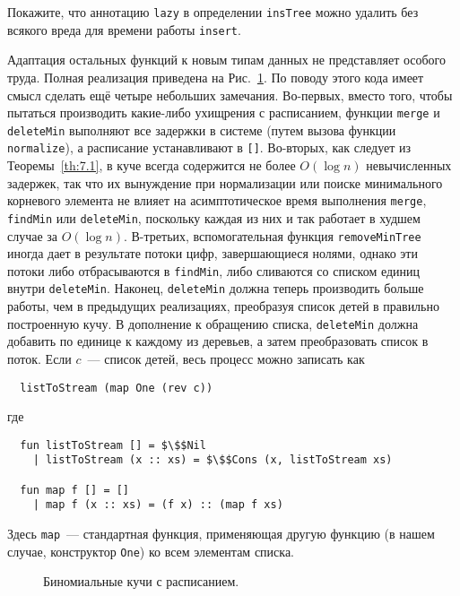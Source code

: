 \begin{exercise}\label{ex:7.3}
  Покажите, что аннотацию \lstinline!lazy! в определении
  \lstinline!insTree! можно удалить без всякого вреда для времени
  работы \lstinline!insert!.
\end{exercise}

Адаптация остальных функций к новым типам данных не представляет
особого труда. Полная реализация приведена на
Рис.~\ref{fig:7.2}. По поводу этого кода имеет смысл сделать ещё
четыре небольших замечания. Во-первых, вместо того, чтобы пытаться
производить какие-либо ухищрения с расписанием, функции
\lstinline!merge! и \lstinline!deleteMin! выполняют все задержки в
системе (путем вызова функции \lstinline!normalize!), а расписание
устанавливают в \lstinline![]!. Во-вторых, как следует из
Теоремы~\ref{th:7.1}, в куче всегда содержится не более $O(\log n)$
невычисленных задержек, так что их вынуждение при нормализации или
поиске минимального корневого элемента не влияет на асимптотическое
время выполнения \lstinline!merge!, \lstinline!findMin! или
\lstinline!deleteMin!, поскольку каждая из них и так работает в худшем
случае за $O(\log n)$. В-третьих, вспомогательная функция
\lstinline!removeMinTree! иногда дает в результате потоки цифр,
завершающиеся нолями, однако эти потоки либо отбрасываются в
\lstinline!findMin!, либо сливаются со списком единиц внутри
\lstinline!deleteMin!. Наконец, \lstinline!deleteMin! должна теперь
производить больше работы, чем в предыдущих реализациях, преобразуя
список детей в правильно построенную кучу. В дополнение к обращению
списка, \lstinline!deleteMin! должна добавить по единице к каждому из
деревьев, а затем преобразовать список в поток. Если $c$~--- список
детей, весь процесс можно записать как
\begin{lstlisting}
  listToStream (map One (rev c))
\end{lstlisting}
где
\begin{lstlisting}
  fun listToStream [] = $\$$Nil
    | listToStream (x :: xs) = $\$$Cons (x, listToStream xs)

  fun map f [] = []
    | map f (x :: xs) = (f x) :: (map f xs)
\end{lstlisting}
Здесь \lstinline!map!~--- стандартная функция, применяющая другую
функцию (в нашем случае, конструктор \lstinline!One!) ко всем
элементам списка.

\begin{figure}
  \centering
  
  \caption{Биномиальные кучи с расписанием.}
  \label{fig:7.2}
\end{figure}

